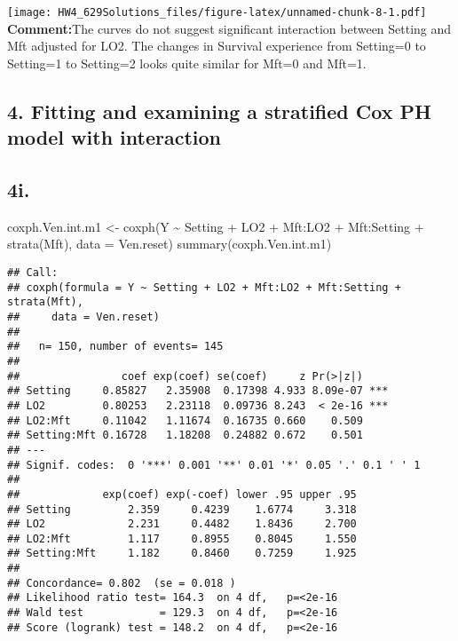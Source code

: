 \documentclass[
]{article}
\newenvironment{Shaded}{\begin{snugshade}}{\end{snugshade}}
\newcommand{\AttributeTok}[1]{\textcolor[rgb]{0.77,0.63,0.00}{#1}}
\newcommand{\FunctionTok}[1]{\textcolor[rgb]{0.00,0.00,0.00}{#1}}
\newcommand{\NormalTok}[1]{#1}
\newcommand{\OtherTok}[1]{\textcolor[rgb]{0.56,0.35,0.01}{#1}}
\newcommand{\SpecialCharTok}[1]{\textcolor[rgb]{0.00,0.00,0.00}{#1}}
\begin{document}
\texttt{[image: HW4\_629Solutions\_files/figure-latex/unnamed-chunk-8-1.pdf]}
\textbf{Comment:}The curves do not suggest significant interaction
between Setting and Mft adjusted for LO2. The changes in Survival
experience from Setting=0 to Setting=1 to Setting=2 looks quite similar
for Mft=0 and Mft=1.

\hypertarget{fitting-and-examining-a-stratified-cox-ph-model-with-interaction}{%
\subsection{4. Fitting and examining a stratified Cox PH model with
interaction}\label{fitting-and-examining-a-stratified-cox-ph-model-with-interaction}}

\hypertarget{i.}{%
\subsection{4i.}\label{i.}}

\begin{Shaded}
\begin{Highlighting}[]
\NormalTok{coxph.Ven.int.m1 }\OtherTok{\textless{}{-}} \FunctionTok{coxph}\NormalTok{(Y }\SpecialCharTok{\textasciitilde{}}\NormalTok{ Setting }\SpecialCharTok{+}\NormalTok{ LO2 }\SpecialCharTok{+}\NormalTok{ Mft}\SpecialCharTok{:}\NormalTok{LO2 }\SpecialCharTok{+}\NormalTok{ Mft}\SpecialCharTok{:}\NormalTok{Setting }\SpecialCharTok{+} \FunctionTok{strata}\NormalTok{(Mft),}
    \AttributeTok{data =}\NormalTok{ Ven.reset)}
\FunctionTok{summary}\NormalTok{(coxph.Ven.int.m1)}
\end{Highlighting}
\end{Shaded}

\begin{verbatim}
## Call:
## coxph(formula = Y ~ Setting + LO2 + Mft:LO2 + Mft:Setting + strata(Mft), 
##     data = Ven.reset)
## 
##   n= 150, number of events= 145 
## 
##                coef exp(coef) se(coef)     z Pr(>|z|)    
## Setting     0.85827   2.35908  0.17398 4.933 8.09e-07 ***
## LO2         0.80253   2.23118  0.09736 8.243  < 2e-16 ***
## LO2:Mft     0.11042   1.11674  0.16735 0.660    0.509    
## Setting:Mft 0.16728   1.18208  0.24882 0.672    0.501    
## ---
## Signif. codes:  0 '***' 0.001 '**' 0.01 '*' 0.05 '.' 0.1 ' ' 1
## 
##             exp(coef) exp(-coef) lower .95 upper .95
## Setting         2.359     0.4239    1.6774     3.318
## LO2             2.231     0.4482    1.8436     2.700
## LO2:Mft         1.117     0.8955    0.8045     1.550
## Setting:Mft     1.182     0.8460    0.7259     1.925
## 
## Concordance= 0.802  (se = 0.018 )
## Likelihood ratio test= 164.3  on 4 df,   p=<2e-16
## Wald test            = 129.3  on 4 df,   p=<2e-16
## Score (logrank) test = 148.2  on 4 df,   p=<2e-16
\end{verbatim}
\end{document}
